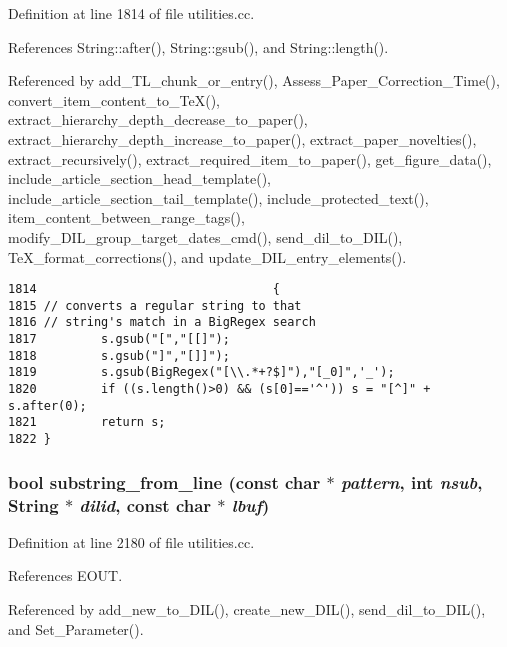 Definition at line 1814 of file utilities.cc.

References String::after(), String::gsub(), and String::length().

Referenced by add\_\-TL\_\-chunk\_\-or\_\-entry(), Assess\_\-Paper\_\-Correction\_\-Time(), convert\_\-item\_\-content\_\-to\_\-Te\-X(), extract\_\-hierarchy\_\-depth\_\-decrease\_\-to\_\-paper(), extract\_\-hierarchy\_\-depth\_\-increase\_\-to\_\-paper(), extract\_\-paper\_\-novelties(), extract\_\-recursively(), extract\_\-required\_\-item\_\-to\_\-paper(), get\_\-figure\_\-data(), include\_\-article\_\-section\_\-head\_\-template(), include\_\-article\_\-section\_\-tail\_\-template(), include\_\-protected\_\-text(), item\_\-content\_\-between\_\-range\_\-tags(), modify\_\-DIL\_\-group\_\-target\_\-dates\_\-cmd(), send\_\-dil\_\-to\_\-DIL(), Te\-X\_\-format\_\-corrections(), and update\_\-DIL\_\-entry\_\-elements().



\footnotesize\begin{verbatim}1814                                 {
1815 // converts a regular string to that
1816 // string's match in a BigRegex search
1817         s.gsub("[","[[]");
1818         s.gsub("]","[]]");
1819         s.gsub(BigRegex("[\\.*+?$]"),"[_0]",'_');
1820         if ((s.length()>0) && (s[0]=='^')) s = "[^]" + s.after(0);
1821         return s;
1822 }
\end{verbatim}\normalsize 
{}
\subsubsection{\setlength{\rightskip}{0pt plus 5cm}bool substring\_\-from\_\-line (const char $\ast$ {\em pattern}, int {\em nsub}, {\bf String} $\ast$ {\em dilid}, const char $\ast$ {\em lbuf})}\label{utilities_8cc_a45}




Definition at line 2180 of file utilities.cc.

References EOUT.

Referenced by add\_\-new\_\-to\_\-DIL(), create\_\-new\_\-DIL(), send\_\-dil\_\-to\_\-DIL(), and Set\_\-Parameter().



